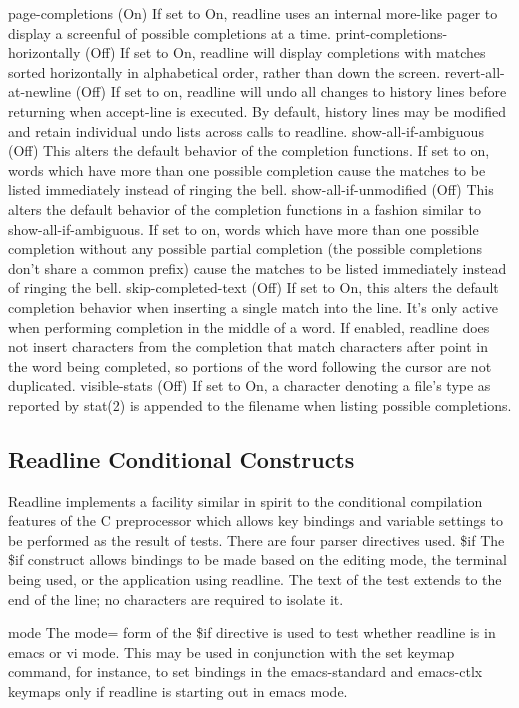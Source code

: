 page-completions (On)
If set to On, readline uses an internal more-like pager to display a screenful of possible completions at a time.
print-completions-horizontally (Off)
If set to On, readline will display completions with matches sorted horizontally in alphabetical order, rather than down the screen.
revert-all-at-newline (Off)
If set to on, readline will undo all changes to history lines before returning when accept-line is executed. By default, history lines may be modified and retain individual undo lists across calls to readline.
show-all-if-ambiguous (Off)
This alters the default behavior of the completion functions. If set to on, words which have more than one possible completion cause the matches to be listed immediately instead of ringing the bell.
show-all-if-unmodified (Off)
This alters the default behavior of the completion functions in a fashion similar to show-all-if-ambiguous. If set to on, words which have more than one possible completion without any possible partial completion (the possible completions don't share a common prefix) cause the matches to be listed immediately instead of ringing the bell.
skip-completed-text (Off)
If set to On, this alters the default completion behavior when inserting a single match into the line. It's only active when performing completion in the middle of a word. If enabled, readline does not insert characters from the completion that match characters after point in the word being completed, so portions of the word following the cursor are not duplicated.
visible-stats (Off)
If set to On, a character denoting a file's type as reported by stat(2) is appended to the filename when listing possible completions.

\subsection{Readline Conditional Constructs}\label{sec:readlineconditionalconstructs}

Readline implements a facility similar in spirit to the conditional compilation features of the C preprocessor which allows key bindings and variable settings to be performed as the result of tests. There are four parser directives used.
\$if
The \$if construct allows bindings to be made based on the editing mode, the terminal being used, or the application using readline. The text of the test extends to the end of the line; no characters are required to isolate it.

mode
The mode= form of the \$if directive is used to test whether readline is in emacs or vi mode. This may be used in conjunction with the set keymap command, for instance, to set bindings in the emacs-standard and emacs-ctlx keymaps only if readline is starting out in emacs mode.

